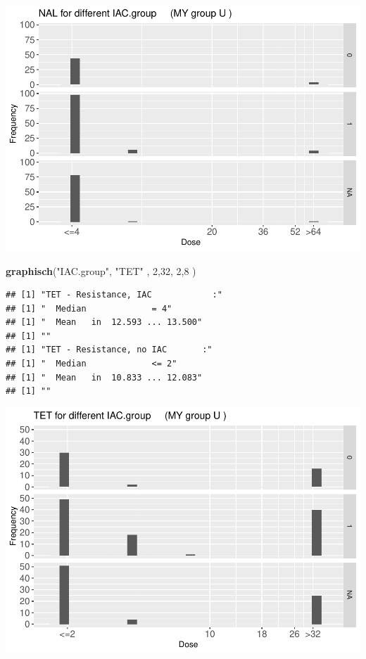 \documentclass[
]{article}
\newenvironment{Shaded}{\begin{snugshade}}{\end{snugshade}}
\newcommand{\DecValTok}[1]{\textcolor[rgb]{0.00,0.00,0.81}{#1}}
\newcommand{\KeywordTok}[1]{\textcolor[rgb]{0.13,0.29,0.53}{\textbf{#1}}}
\newcommand{\NormalTok}[1]{#1}
\newcommand{\StringTok}[1]{\textcolor[rgb]{0.31,0.60,0.02}{#1}}
\begin{document}
\includegraphics{Verteilungen_files/figure-latex/unnamed-chunk-14-1.pdf}

\begin{Shaded}
\begin{Highlighting}[]
   \KeywordTok{graphisch}\NormalTok{(}\StringTok{"IAC.group"}\NormalTok{, }\StringTok{"TET"}\NormalTok{ , }\DecValTok{2}\NormalTok{,}\DecValTok{32}\NormalTok{,   }\DecValTok{2}\NormalTok{,}\DecValTok{8}\NormalTok{    ) }
\end{Highlighting}
\end{Shaded}

\begin{verbatim}
## [1] "TET - Resistance, IAC            :"
## [1] "  Median             = 4"
## [1] "  Mean   in  12.593 ... 13.500"
## [1] ""
## [1] "TET - Resistance, no IAC       :"
## [1] "  Median             <= 2"
## [1] "  Mean   in  10.833 ... 12.083"
## [1] ""
\end{verbatim}

\includegraphics{Verteilungen_files/figure-latex/unnamed-chunk-15-1.pdf}
\end{document}
